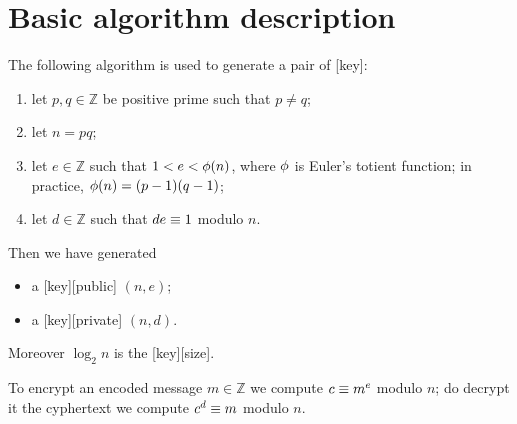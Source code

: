 \section{Basic algorithm description}
\par The following algorithm is used to generate a pair of [key]:
\begin{enumerate}
  \item let $p, q \in \mathbb{Z}$ be positive prime such that $p \neq q$;
  \item let $n = pq$;
  \item let $e \in \mathbb{Z}$ such that $1 < e < \phi(n)$, where $\phi$ is Euler's totient function; in practice, $\phi(n) = (p - 1)(q - 1)$;
  \item let $d \in \mathbb{Z}$ such that $de \equiv 1$ modulo $n$.
\end{enumerate}
\par Then we have generated
\begin{itemize}
  \item a [key][public] $(n,e)$;
  \item a [key][private] $(n,d)$.
\end{itemize}
\par Moreover $\log_2 n$ is the [key][size].
\par To encrypt an encoded message $m \in \mathbb{Z}$ we compute $c \equiv m^e$ modulo $n$; do decrypt it the cyphertext we compute $c^d \equiv m$ modulo $n$.

